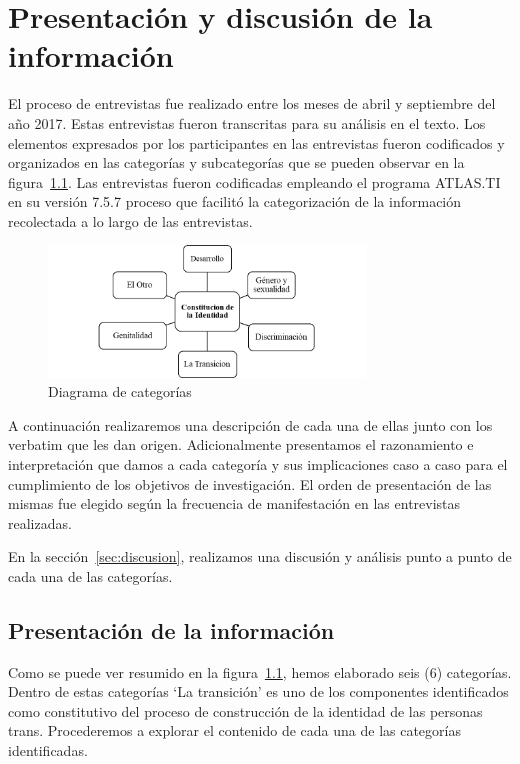 \chapter{Presentación y discusión de la información}\label{ch:informacion}

El proceso de entrevistas fue realizado entre los meses de abril y septiembre
del año 2017.
Estas entrevistas fueron transcritas para su análisis en el texto.
Los elementos expresados por los participantes en las entrevistas fueron
codificados y organizados en las categorías y subcategorías que se pueden
observar en la figura~\ref{fig:categorias}.
Las entrevistas fueron codificadas empleando el programa ATLAS.TI en su versión
7.5.7 proceso que facilitó la categorización de la información recolectada a lo
largo de las entrevistas.

\begin{figure}
    \centering
    \includegraphics[width=0.75\textwidth]{categorias}
    \caption{Diagrama de categorías}\label{fig:categorias}
\end{figure}

A continuación realizaremos una descripción de cada una de ellas junto con los
verbatim que les dan origen.
Adicionalmente presentamos el razonamiento e interpretación que damos a cada
categoría y sus implicaciones caso a caso para el cumplimiento de los objetivos
de investigación.
El orden de presentación de las mismas fue elegido
según la frecuencia de manifestación en las entrevistas realizadas.

En la sección~\ref{sec:discusion}, realizamos una discusión y análisis punto a
punto de cada una de las categorías.

\section{Presentación de la información}

Como se puede ver resumido en la figura~\ref{fig:categorias}, hemos elaborado
seis (6) categorías. Dentro de estas categorías ‘La transición’ es uno de los
componentes identificados como constitutivo del proceso de construcción de la
identidad de las personas trans. Procederemos a explorar el contenido de cada
una de las categorías identificadas.

